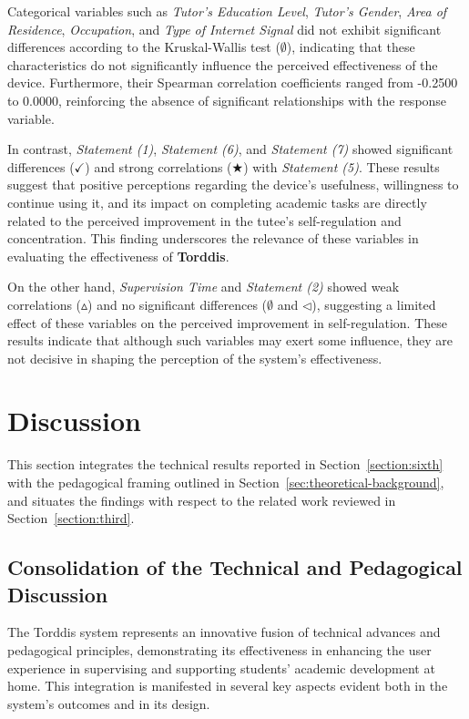                 Categorical variables such as \textit{Tutor's Education Level}, \textit{Tutor's Gender}, \textit{Area of Residence}, \textit{Occupation}, and \textit{Type of Internet Signal} did not exhibit significant differences according to the Kruskal-Wallis test (\(\emptyset\)), indicating that these characteristics do not significantly influence the perceived effectiveness of the device. Furthermore, their Spearman correlation coefficients ranged from -0.2500 to 0.0000, reinforcing the absence of significant relationships with the response variable.
                
                In contrast, \textit{Statement (1)}, \textit{Statement (6)}, and \textit{Statement (7)} showed significant differences (\(\checkmark\)) and strong correlations (\(\bigstar\)) with \textit{Statement (5)}. These results suggest that positive perceptions regarding the device's usefulness, willingness to continue using it, and its impact on completing academic tasks are directly related to the perceived improvement in the tutee’s self-regulation and concentration. This finding underscores the relevance of these variables in evaluating the effectiveness of \textbf{Torddis}.
                
                On the other hand, \textit{Supervision Time} and \textit{Statement (2)} showed weak correlations (\(\vartriangle\)) and no significant differences (\(\emptyset\) and \(\triangleleft\)), suggesting a limited effect of these variables on the perceived improvement in self-regulation. These results indicate that although such variables may exert some influence, they are not decisive in shaping the perception of the system's effectiveness.
                
                \section{Discussion}
                \label{section:discussion}
                This section integrates the technical results reported in Section~\ref{section:sixth} with the pedagogical framing outlined in Section~\ref{sec:theoretical-background}, and situates the findings with respect to the related work reviewed in Section~\ref{section:third}.

\subsection{Consolidation of the Technical and Pedagogical Discussion}
                The Torddis system represents an innovative fusion of technical advances and pedagogical principles, demonstrating its effectiveness in enhancing the user experience in supervising and supporting students’ academic development at home. This integration is manifested in several key aspects evident both in the system's outcomes and in its design.
                
